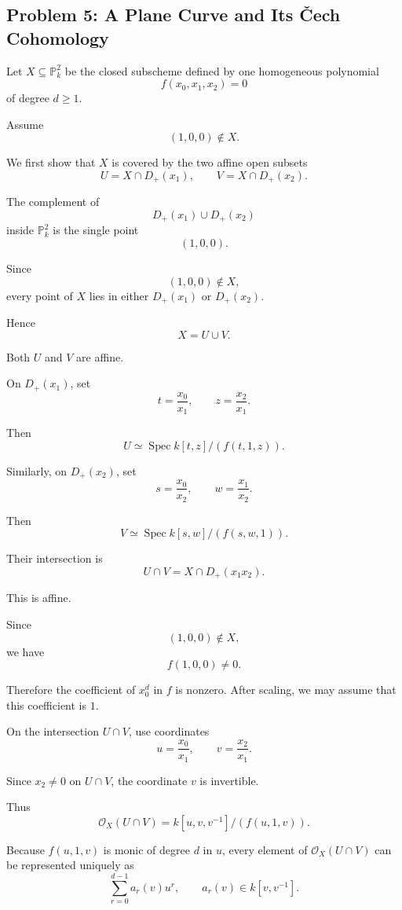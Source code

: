 
\subsection*{Problem 5: A Plane Curve and Its \v{C}ech Cohomology}

Let \(X\subseteq\mathbb P_k^2\) be the closed subscheme defined by one
homogeneous polynomial
\[
f(x_0,x_1,x_2)=0
\]
of degree \(d\ge1\).

Assume
\[
(1,0,0)\notin X.
\]

We first show that \(X\) is covered by the two affine open subsets
\[
U=X\cap D_+(x_1),
\qquad
V=X\cap D_+(x_2).
\]

The complement of
\[
D_+(x_1)\cup D_+(x_2)
\]
inside \(\mathbb P_k^2\) is the single point
\[
(1,0,0).
\]

Since
\[
(1,0,0)\notin X,
\]
every point of \(X\) lies in either \(D_+(x_1)\) or \(D_+(x_2)\).

Hence
\[
X=U\cup V.
\]

Both \(U\) and \(V\) are affine.

On \(D_+(x_1)\), set
\[
t=\frac{x_0}{x_1},
\qquad
z=\frac{x_2}{x_1}.
\]

Then
\[
U\simeq \operatorname{Spec} k[t,z]/(f(t,1,z)).
\]

Similarly, on \(D_+(x_2)\), set
\[
s=\frac{x_0}{x_2},
\qquad
w=\frac{x_1}{x_2}.
\]

Then
\[
V\simeq \operatorname{Spec} k[s,w]/(f(s,w,1)).
\]

Their intersection is
\[
U\cap V=X\cap D_+(x_1x_2).
\]

This is affine.

Since
\[
(1,0,0)\notin X,
\]
we have
\[
f(1,0,0)\neq0.
\]

Therefore the coefficient of \(x_0^d\) in \(f\) is nonzero. After scaling,
we may assume that this coefficient is \(1\).

On the intersection \(U\cap V\), use coordinates
\[
u=\frac{x_0}{x_1},
\qquad
v=\frac{x_2}{x_1}.
\]

Since \(x_2\neq0\) on \(U\cap V\), the coordinate \(v\) is invertible.

Thus
\[
\mathcal O_X(U\cap V)
=
k[u,v,v^{-1}]/(f(u,1,v)).
\]

Because \(f(u,1,v)\) is monic of degree \(d\) in \(u\), every element of
\(\mathcal O_X(U\cap V)\) can be represented uniquely as
\[
\sum_{r=0}^{d-1} a_r(v)u^r,
\qquad
a_r(v)\in k[v,v^{-1}].
\]

